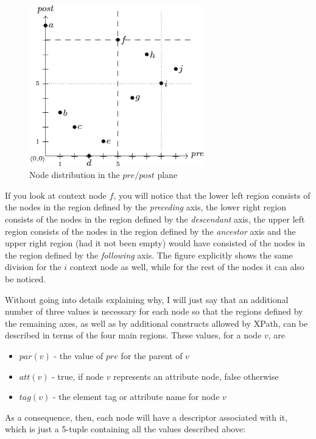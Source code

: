 \documentclass[a4paper,10pt]{article}
\begin{document}
\begin{figure}[ht]
\begin{center}
\includegraphics[width=3in]{img/prepost.png}
\end{center}
\caption{Node distribution in the $pre/post$ plane}
\label{fig:prepost}
\end{figure}

If you look at context node $f$, you will notice that the lower left region consists of the nodes in
the region defined by the \textit{preceding} axis, the lower right region consists of the nodes in the
region defined by the \textit{descendant} axis, the upper left region consists of the nodes in the
region defined by the \textit{ancestor} axis and the upper right region (had it not been empty)
would have consisted of the nodes in the region defined by the \textit{following} axis. The figure
explicitly shows the same division for the $i$ context node as well, while for the rest of the nodes
it can also be noticed.

Without going into details explaining why, I will just say that an additional number of three values
is necessary for each node so that the regions defined by the remaining axes, as well as by additional
constructs allowed by XPath, can be described in terms of the four main regions. These values, for
a node $v$, are

\begin{itemize}
\item $par(v)$ - the value of $pre$ for the parent of $v$
\item $att(v)$ - true, if node $v$ represents an attribute node, false otherwise
\item $tag(v)$ - the element tag or attribute name for node $v$
\end{itemize}

As a consequence, then, each node will have a descriptor associated with it, which is just a 5-tuple
containing all the values described above:\\
\end{document}
